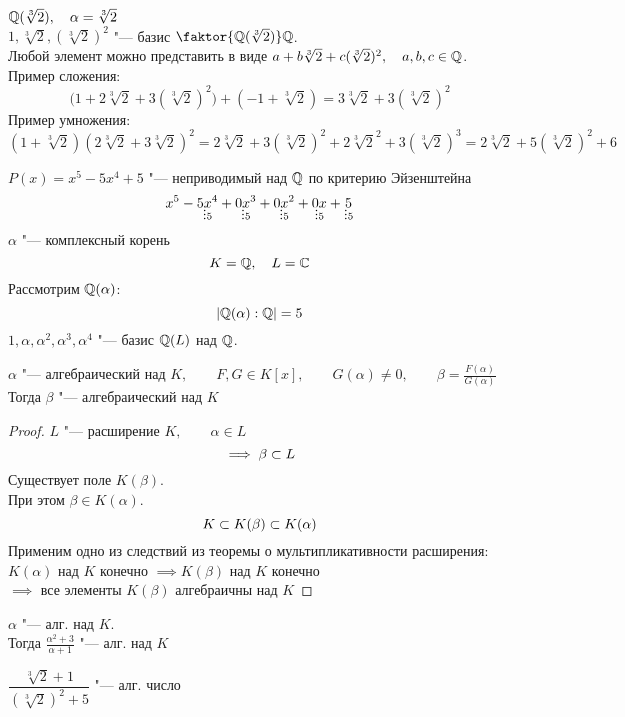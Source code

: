 \begin{exmpls}
	\item $ \mathbb{Q}(\sqrt[3]2), \quad \alpha = \sqrt[3]2 $ \\
	$ 1, \sqrt[3]2, (\sqrt[3]2)^2 $ "--- базис $ \faktor{\Q(\sqrt[3]2)}\Q $. \\
	Любой элемент можно представить в виде $ a + b\sqrt[3]2 + c(\sqrt[3]2)^2, \quad a, b, c \in \mathbb{Q} $. \\
	Пример сложения:
	$$ \bigg( 1 + 2\sqrt[3]2 + 3(\sqrt[3]2)^2 \bigg) + (-1 + \sqrt[3]2) = 3\sqrt[3]2 + 3(\sqrt[3]2)^2 $$
	Пример умножения:
	$$ (1 + \sqrt[3]2)(2\sqrt[3]2 + 3\sqrt[3]2)^2 = 2\sqrt[3]2 + 3(\sqrt[3]2)^2 + 2\sqrt[3]2^2 + 3(\sqrt[3]2)^3 = 2\sqrt[3]2 + 5(\sqrt[3]2)^2 + 6 $$
	\item $ P(x) = x^5 - 5x^4 + 5 $ "--- неприводимый над $ \mathbb{Q} $ по критерию Эйзенштейна
	$$ x^5 - \underset{\divby 5}{5x^4} + \underset{\divby 5}{0x^3} + \underset{\divby 5}{0x^2} + \underset{\divby 5}{0x} + \underset{\divby 5}5 $$
	$ \alpha $ "--- комплексный корень
	$$ K = \mathbb{Q}, \quad L = \mathbb{C} $$
	Рассмотрим $ \mathbb{Q}(\alpha) $:
	$$ |\mathbb{Q}(\alpha) : \mathbb{Q}| = 5 $$
	$ 1, \alpha, \alpha^2, \alpha^3, \alpha^4 $ "--- базис $ \mathbb{Q}(L) $ над $ \mathbb{Q} $.
\end{exmpls}

\begin{implication}
	$ \alpha $ "--- алгебраический над $ K, \qquad F, G \in K[x], \qquad G(\alpha) \ne 0, \qquad \beta = \frac{F(\alpha)}{G(\alpha)} $ \\
	Тогда $ \beta $ "--- алгебраический над $ K $
\end{implication}

\begin{proof}
	$ L $ "--- расширение $ K, \qquad \alpha \in L $
	$$ \implies \beta \subset L $$
	Существует поле $ K(\beta) $. \\
	При этом $ \beta \in K(\alpha) $.
	$$ K \subset K(\beta) \subset K(\alpha) $$
	Применим одно из следствий из теоремы о мультипликативности расширения: \\
	$ K(\alpha) $ над $ K $ конечно $ \implies K(\beta) $ над $ K $ конечно \\
	$ \implies $ все элементы $ K(\beta) $ алгебраичны над $ K $
\end{proof}

\begin{exmpls}
	\item $ \alpha $ "--- алг. над $ K $. \\
	Тогда $ \frac{\alpha^2 + 3}{\alpha + 1} $ "--- алг. над $ K $
	\item $ \dfrac{\sqrt[3]2 + 1}{(\sqrt[3]2)^2 + 5} $ "--- алг. число
\end{exmpls}

